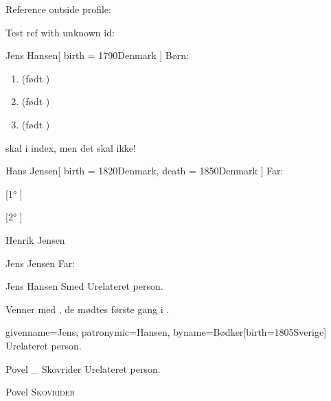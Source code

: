 \documentclass[
	twocolumn
]{article}
\begin{document}
Reference outside profile: 

Test ref with unknown id: 

\begin{gprProfile}{Jens Hansen}[
	birth = {1790}{Denmark}
]
	Børn:
	\begin{enumerate}
	\item {} (født )
	\item {} (født )
	\item {} (født )
	\end{enumerate}

	 skal i index, men det skal  ikke!
\end{gprProfile}

\begin{gprProfile}{Hans Jensen}[
	birth = {1820}{Denmark},
	death = {1850}{Denmark}
]
	Far:

	[1° ]

	[2° ]
\end{gprProfile}

\begin{gprProfile}{Henrik Jensen}
	
	\lipsum[1-5]

\end{gprProfile}

\begin{gprProfile}[id=ABC]{Jens Jensen}
	Far:

\end{gprProfile}

\begin{gprProfile}{Jens Hansen Smed}
	Urelateret person.
	
	Venner med , de mødtes første gang i .

\end{gprProfile}

\begin{gprProfile*}{givenname=Jens, patronymic=Hansen, byname=Bødker}[birth={1805}{Sverige}]
	Urelateret person.

\end{gprProfile*}

\begin{gprProfile}{Povel _ Skovrider}
	Urelateret person.
	
	\gprStyledName{}
	
	{\gprGivenName{} {\scshape \gprByname{}}}
	
	{Povel {\scshape Skovrider}}

\end{gprProfile}
\end{document}
